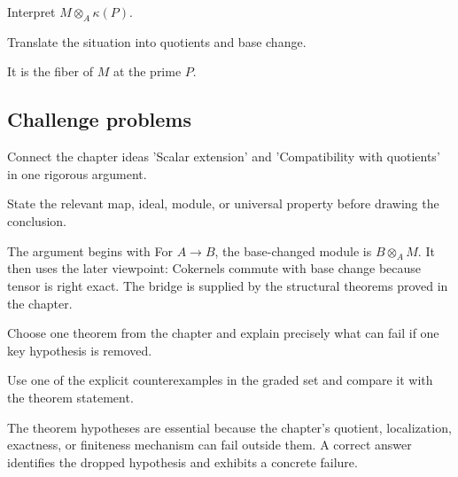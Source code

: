 \begin{exercise}\label{exr:v11-expand-14}
Interpret $M\otimes_A\kappa(P)$.
\end{exercise}
\begin{hint}
Translate the situation into quotients and base change.
\end{hint}
\begin{solution}
It is the fiber of $M$ at the prime $P$.
\end{solution}

\subsection*{Challenge problems}

\begin{exercise}\label{exr:v11-expand-15}
Connect the chapter ideas 'Scalar extension' and 'Compatibility with quotients' in one rigorous argument.
\end{exercise}
\begin{hint}
State the relevant map, ideal, module, or universal property before drawing the conclusion.
\end{hint}
\begin{solution}
The argument begins with For $A\to B$, the base-changed module is $B\otimes_A M$. It then uses the later viewpoint: Cokernels commute with base change because tensor is right exact. The bridge is supplied by the structural theorems proved in the chapter.
\end{solution}

\begin{exercise}\label{exr:v11-expand-16}
Choose one theorem from the chapter and explain precisely what can fail if one key hypothesis is removed.
\end{exercise}
\begin{hint}
Use one of the explicit counterexamples in the graded set and compare it with the theorem statement.
\end{hint}
\begin{solution}
The theorem hypotheses are essential because the chapter's quotient, localization, exactness, or finiteness mechanism can fail outside them. A correct answer identifies the dropped hypothesis and exhibits a concrete failure.
\end{solution}

